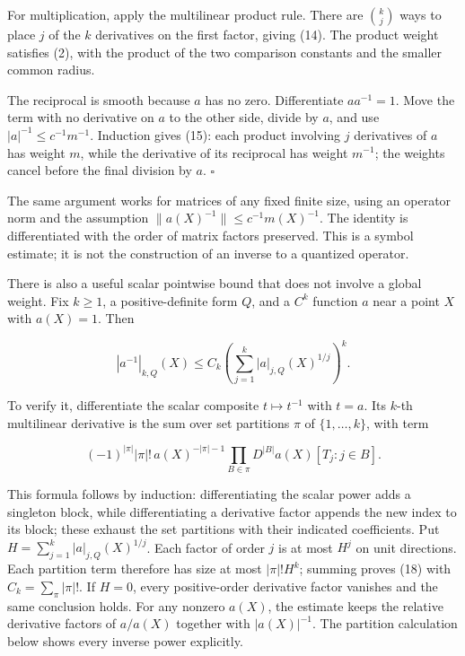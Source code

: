 \documentclass[
  11pt,
]{article}
\begin{document}
For multiplication, apply the multilinear product rule. There are
\(\binom{k}{j}\) ways to place \(j\) of the \(k\) derivatives on the
first factor, giving (14). The product weight satisfies (2), with the
product of the two comparison constants and the smaller common radius.

The reciprocal is smooth because \(a\) has no zero. Differentiate
\(aa^{-1}=1\). Move the term with no derivative on \(a\) to the other
side, divide by \(a\), and use \(|a|^{-1}\leq c^{-1}m^{-1}\). Induction
gives (15): each product involving \(j\) derivatives of \(a\) has weight
\(m\), while the derivative of its reciprocal has weight \(m^{-1}\); the
weights cancel before the final division by \(a\). \(\square\)

The same argument works for matrices of any fixed finite size, using an
operator norm and the assumption \(\|a(X)^{-1}\|\leq c^{-1}m(X)^{-1}\).
The identity is differentiated with the order of matrix factors
preserved. This is a symbol estimate; it is not the construction of an
inverse to a quantized operator.

There is also a useful scalar pointwise bound that does not involve a
global weight. Fix \(k\geq1\), a positive-definite form \(Q\), and a
\(C^k\) function \(a\) near a point \(X\) with \(a(X)=1\). Then

\[
|a^{-1}|_{k,Q}(X)
\leq C_k\left(\sum_{j=1}^k |a|_{j,Q}(X)^{1/j}\right)^k.       \tag{18}
\]

To verify it, differentiate the scalar composite \(t\mapsto t^{-1}\)
with \(t=a\). Its \(k\)-th multilinear derivative is the sum over set
partitions \(\pi\) of \(\{1,\ldots,k\}\), with term

\[
(-1)^{|\pi|}|\pi|!\,a(X)^{-|\pi|-1}
\prod_{B\in\pi}D^{|B|}a(X)[T_j:j\in B].
\]

This formula follows by induction: differentiating the scalar power adds
a singleton block, while differentiating a derivative factor appends the
new index to its block; these exhaust the set partitions with their
indicated coefficients. Put \(H=\sum_{j=1}^k |a|_{j,Q}(X)^{1/j}\). Each
factor of order \(j\) is at most \(H^j\) on unit directions. Each
partition term therefore has size at most \(|\pi|!H^k\); summing proves
(18) with \(C_k=\sum_\pi|\pi|!\). If \(H=0\), every positive-order
derivative factor vanishes and the same conclusion holds. For any
nonzero \(a(X)\), the estimate keeps the relative derivative factors of
\(a/a(X)\) together with \(|a(X)|^{-1}\). The partition calculation
below shows every inverse power explicitly.
\end{document}
